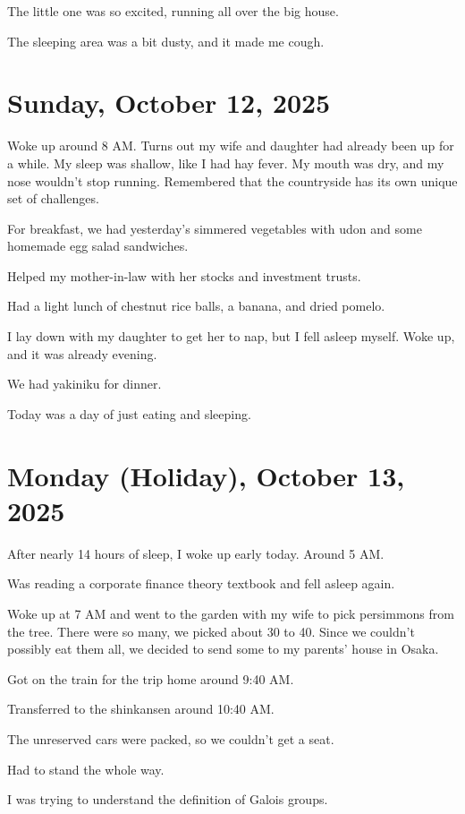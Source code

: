 \documentclass[uplatex]{jsarticle}
\begin{document}
The little one was so excited, running all over the big house.

The sleeping area was a bit dusty, and it made me cough.



\section{Sunday, October 12, 2025}

Woke up around 8 AM.
Turns out my wife and daughter had already been up for a while.
My sleep was shallow, like I had hay fever.
My mouth was dry, and my nose wouldn't stop running.
Remembered that the countryside has its own unique set of challenges.

For breakfast, we had yesterday's simmered vegetables with udon and some homemade egg salad sandwiches.

Helped my mother-in-law with her stocks and investment trusts.

Had a light lunch of chestnut rice balls, a banana, and dried pomelo.

I lay down with my daughter to get her to nap, but I fell asleep myself. Woke up, and it was already evening.

We had yakiniku for dinner.

Today was a day of just eating and sleeping.


\section{Monday (Holiday), October 13, 2025}

After nearly 14 hours of sleep, I woke up early today. Around 5 AM.

Was reading a corporate finance theory textbook and fell asleep again.

Woke up at 7 AM and went to the garden with my wife to pick persimmons from the tree.
There were so many, we picked about 30 to 40.
Since we couldn't possibly eat them all, we decided to send some to my parents' house in Osaka.

Got on the train for the trip home around 9:40 AM.

Transferred to the shinkansen around 10:40 AM.

The unreserved cars were packed, so we couldn't get a seat.

Had to stand the whole way.

I was trying to understand the definition of Galois groups.
\end{document}

